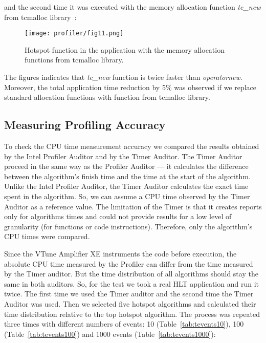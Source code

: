 \noindent and the second time it was executed with the memory allocation function {\it
tc\_new} from tcmalloc library~\cite{perftools}:

\begin{figure}[H]
\texttt{[image: profiler/fig11.png]}
\caption{Hotspot function in the \moore application with the memory allocation functions from tcmalloc 
library.}
\label{fig11}
\end{figure}

The figures indicates that {\it tc\_new} function is twice faster than {\it
operatornew}. Moreover, the total application time reduction by 5\% was
observed if we replace standard allocation functions with function from
tcmalloc library.

\subsection{Measuring Profiling Accuracy}
\label{sec:accuracy}
To check the CPU time measurement accuracy we compared the results obtained by
the \gaudi Intel Profiler Auditor and by the \gaudi Timer Auditor. The Timer
Auditor proceed  in the same way as the Profiler Auditor --- it calculates the
difference between the algorithm's finish time and the time at the start of the
algorithm. Unlike the \gaudi Intel Profiler Auditor, the Timer Auditor
calculates the exact time spent in the algorithm. So, we can assume a CPU time
observed by the Timer Auditor as a reference value. The limitation of the Timer
is that it creates reports only for algorithms times  and could not provide
results for a low level of granularity (for functions or code instructions).
Therefore, only the algorithm's CPU times were compared.

Since the VTune Amplifier XE instruments the code before execution, the
absolute CPU time measured by the Profiler can differ from the time measured by
the Timer auditor.  But the time distribution of all algorithms should stay the
same in both auditors.  So, for the test we took a real HLT application and run
it twice. The first time we used the Timer auditor and the second time the
\gaudi Timer Auditor was used. Then we selected five hotspot algorithms and
calculated their time distribution relative to the top hotspot algorithm. The
process was repeated three times with different numbers of events: 10
(Table~\ref{tab:tevents10}), 100 (Table~\ref{tab:tevents100}) and 1000 events
(Table~\ref{tab:tevents1000}):

